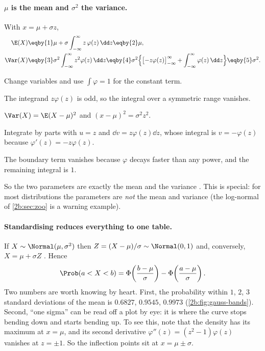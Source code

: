 \paragraph{$\mu$ is the mean and $\sigma^2$ the variance.} With $x=\mu+\sigma z$,
\begin{align}
  \E(X)
  &\eqby{1} \mu+\sigma\int_{-\infty}^{\infty} z\,\varphi(z)\,\dd z \eqby{2} \mu , \nonumber\\
  \Var(X)
  &\eqby{3} \sigma^2\int_{-\infty}^{\infty} z^2\varphi(z)\,\dd z
   \eqby{4} \sigma^2\Bigl\{\bigl[-z\varphi(z)\bigr]_{-\infty}^{\infty}+\int_{-\infty}^{\infty}\varphi(z)\,\dd z\Bigr\}
   \eqby{5} \sigma^2 .
  \label{2b:eq:gauss-moments}
\end{align}
\begin{explain}
  \item Change variables and use $\int\varphi=1$ for the constant term.
  \item The integrand $z\varphi(z)$ is odd, so the integral over a symmetric range vanishes.
  \item $\Var(X)=\E(X-\mu)^2$ and $(x-\mu)^2=\sigma^2z^2$.
  \item Integrate by parts with $u=z$ and $\dd v=z\varphi(z)\dd z$, whose integral is $v=-\varphi(z)$ because $\varphi'(z)=-z\varphi(z)$.
  \item The boundary term vanishes because $\varphi$ decays faster than any power, and the remaining integral is $1$.
\end{explain}
So the two parameters are exactly the mean and the variance . This is special: for most distributions the parameters are \emph{not} the mean and variance (the log-normal of \cref{2b:sec:zoo} is a warning example).

\paragraph{Standardising reduces everything to one table.} If $X\sim\Normal(\mu,\sigma^2)$ then $Z=(X-\mu)/\sigma\sim\Normal(0,1)$ and, conversely, $X=\mu+\sigma Z$ . Hence
\begin{equation}
  \Prob(a<X<b)=\Phi\!\left(\frac{b-\mu}{\sigma}\right)-\Phi\!\left(\frac{a-\mu}{\sigma}\right).
  \label{2b:eq:gauss-prob}
\end{equation}
Two numbers are worth knowing by heart. First, the probability within $1$, $2$, $3$ standard deviations of the mean is $0.6827$, $0.9545$, $0.9973$ (\cref{2b:fig:gauss-bands}). Second, ``one sigma'' can be read off a plot by eye: it is where the curve stops bending down and starts bending up. To see this, note that the density has its maximum at $x=\mu$, and its second derivative $\varphi''(z)=(z^2-1)\varphi(z)$ vanishes at $z=\pm1$. So the inflection points sit at $x=\mu\pm\sigma$.

